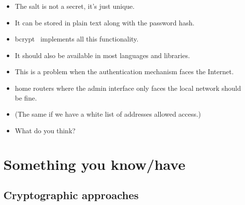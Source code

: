 \begin{frame}
  \begin{remark}
    \begin{itemize}
      \item The salt is not a secret, it's just unique.
      \item It can be stored in plain text along with the password hash.
    \end{itemize}
  \end{remark}
\end{frame}

\begin{frame}
  \begin{example}
    \begin{itemize}
      \item bcrypt~\cite{bcrypt} implements all this functionality.
      \item It should also be available in most languages and libraries.
    \end{itemize}
  \end{example}
\end{frame}

\begin{frame}
  \begin{exercise}
    \begin{itemize}
      \item This is a problem when the authentication mechanism faces the 
        Internet.

      \item \Eg home routers where the admin interface only faces the local 
        network should be fine.

      \item (The same if we have a white list of addresses allowed access.)

      \item What do you think?
    \end{itemize}
  \end{exercise}
\end{frame}


\section{Something you know/have}

\subsection{Cryptographic approaches}

